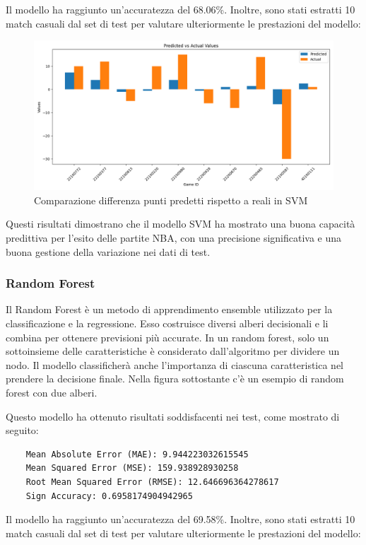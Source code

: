 Il modello ha raggiunto un'accuratezza del 68.06\%. Inoltre, sono stati estratti 10 match casuali dal set di test per valutare ulteriormente le prestazioni del modello:

\begin{figure}[H]
    \centering
    \includegraphics[width=0.7\linewidth]{img/svm.png}
    \caption{Comparazione differenza punti predetti rispetto a reali in SVM}
    \label{fig:enter-label}
\end{figure}

Questi risultati dimostrano che il modello SVM ha mostrato una buona capacità predittiva per l'esito delle partite NBA, con una precisione significativa e una buona gestione della variazione nei dati di test.

\subsubsection{Random Forest}

Il Random Forest è un metodo di apprendimento ensemble utilizzato per la classificazione e la regressione. Esso costruisce diversi alberi decisionali e li combina per ottenere previsioni più accurate. In un random forest, solo un sottoinsieme delle caratteristiche è considerato dall'algoritmo per dividere un nodo. Il modello classificherà anche l'importanza di ciascuna caratteristica nel prendere la decisione finale. Nella figura sottostante c'è un esempio di random forest con due alberi.

Questo modello ha ottenuto risultati soddisfacenti nei test, come mostrato di seguito:

\begin{lstlisting}
    Mean Absolute Error (MAE): 9.944223032615545
    Mean Squared Error (MSE): 159.938928930258
    Root Mean Squared Error (RMSE): 12.646696364278617
    Sign Accuracy: 0.6958174904942965
\end{lstlisting}

Il modello ha raggiunto un'accuratezza del 69.58\%. Inoltre, sono stati estratti 10 match casuali dal set di test per valutare ulteriormente le prestazioni del modello:

